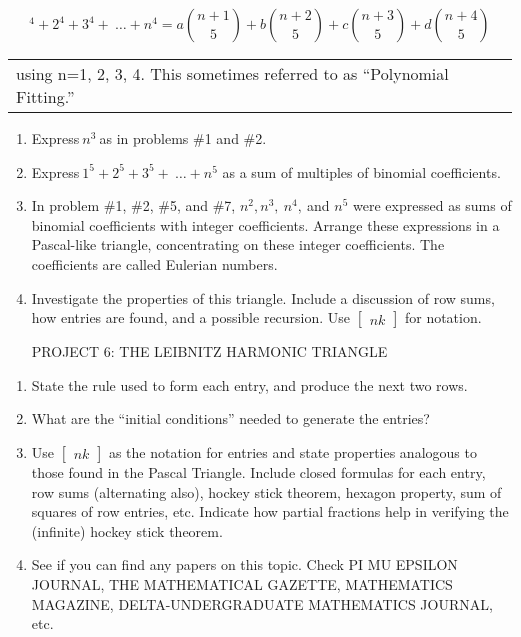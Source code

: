 \documentclass[10pt,letter]{article}
\renewenvironment{quote}
  {\begin{tabular}{|p{13cm}}}
  {\end{tabular}}
\begin{document}
\[
^{4} + 2^{4} + 3^{4} + \ \ldots + n^{4} = a\binom{n + 1}{5}  + b\binom{n + 2}{5}  + c\binom{n + 3}{5}  + d\binom{n + 4}{5}
\]
\begin{quote}
using n=1, 2, 3, 4. This sometimes referred to as ``Polynomial
Fitting.''

\end{quote}
\begin{enumerate}
\def\labelenumi{\arabic{enumi}.}

\item
  Express\(\ n^{3}\ \)as in problems \#1 and \#2.
\item
  Express\(\ 1^{5} + 2^{5} + 3^{5} + \ \ldots + n^{5}\) as a sum of
  multiples of binomial coefficients.
\item
  In problem \#1, \#2, \#5, and \#7, \(n^{2},n^{3},\ n^{4},\ \)and
  \(n^{5}\) were expressed as sums of binomial coefficients with integer
  coefficients. Arrange these expressions in a Pascal-like triangle,
  concentrating on these integer coefficients. The coefficients are
  called Eulerian numbers.
\item
  Investigate the properties of this triangle. Include a discussion of
  row sums, how entries are found, and a possible recursion. Use
  \(\begin{bmatrix}
  n
  k
  \end{bmatrix}
\) for notation.

PROJECT 6: THE LEIBNITZ HARMONIC TRIANGLE

\end{enumerate}
\begin{enumerate}
\def\labelenumi{\arabic{enumi}.}

\item
  State the rule used to form each entry, and produce the next two rows.
\item
  What are the ``initial conditions'' needed to generate the entries?
\item
  Use \(\begin{bmatrix}
  n
  k
  \end{bmatrix}
\) as the notation for entries and state properties
  analogous to those found in the Pascal Triangle. Include closed
  formulas for each entry, row sums (alternating also), hockey stick
  theorem, hexagon property, sum of squares of row entries, etc.
  Indicate how partial fractions help in verifying the (infinite) hockey
  stick theorem.
\item
  See if you can find any papers on this topic. Check PI MU EPSILON
  JOURNAL, THE MATHEMATICAL GAZETTE, MATHEMATICS MAGAZINE,
  DELTA-UNDERGRADUATE MATHEMATICS JOURNAL, etc.

\end{enumerate}
\end{document}
